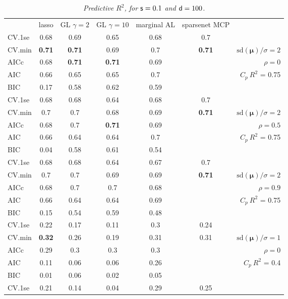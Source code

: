 \documentclass[12pt]{article}
\newcommand{\mr}[1]{\mathrm{#1}}
\newcommand{\bm}[1]{\mathbf{#1}}
\begin{document}
\begin{table}[p]\vspace{-.5cm}
\caption[l]{\label{r2}\it Predictive $R^2$, for ${\sf s}=0.1$ and  ${\sf d}=100$.}
\vspace{-.5cm}
\small{}
\begin{center}
\begin{tabular}{l*{5}{c}|r}
 & lasso & GL $\gamma=2$ & GL $\gamma=10$ & marginal AL & sparsenet MCP  &  \\
\cline{1-7}
CV.1se & 0.68 & 0.69 & 0.65 & 0.68 & 0.7 &\\
CV.min & {\bf 0.71} & {\bf 0.71} & 0.69 & 0.7 & {\bf 0.71} &  $\mr{sd}(\bm{\mu})/\sigma=2$ \\
AICc & 0.68 & {\bf 0.71} & {\bf 0.71} & 0.69 & & $\rho=0$ \\
AIC & 0.66 & 0.65 & 0.65 & 0.7 & & \multirow{2}{*}{$C_p ~ R^2$ = 0.75} \\
BIC & 0.17 & 0.58 & 0.62 & 0.59 & & \\
 \hline 
CV.1se & 0.68 & 0.68 & 0.64 & 0.68 & 0.7 &\\
CV.min & 0.7 & 0.7 & 0.68 & 0.69 & {\bf 0.71} &  $\mr{sd}(\bm{\mu})/\sigma=2$ \\
AICc & 0.68 & 0.7 & {\bf 0.71} & 0.69 & & $\rho=0.5$ \\
AIC & 0.66 & 0.64 & 0.64 & 0.7 & & \multirow{2}{*}{$C_p ~ R^2$ = 0.75} \\
BIC & 0.04 & 0.58 & 0.61 & 0.54 & & \\
 \hline 
CV.1se & 0.68 & 0.68 & 0.64 & 0.67 & 0.7 &\\
CV.min & 0.7 & 0.7 & 0.69 & 0.69 & {\bf 0.71} &  $\mr{sd}(\bm{\mu})/\sigma=2$ \\
AICc & 0.68 & 0.7 & 0.7 & 0.68 & & $\rho=0.9$ \\
AIC & 0.66 & 0.64 & 0.64 & 0.69 & & \multirow{2}{*}{$C_p ~ R^2$ = 0.75} \\
BIC & 0.15 & 0.54 & 0.59 & 0.48 & & \\
 \hline 
CV.1se & 0.22 & 0.17 & 0.11 & 0.3 & 0.24 &\\
CV.min & {\bf 0.32} & 0.26 & 0.19 & 0.31 & 0.31 &  $\mr{sd}(\bm{\mu})/\sigma=1$ \\
AICc & 0.29 & 0.3 & 0.3 & 0.3 & & $\rho=0$ \\
AIC & 0.11 & 0.06 & 0.06 & 0.26 & & \multirow{2}{*}{$C_p ~ R^2$ = 0.4} \\
BIC & 0.01 & 0.06 & 0.02 & 0.05 & & \\
 \hline 
CV.1se & 0.21 & 0.14 & 0.04 & 0.29 & 0.25 &\\

\end{tabular}
\end{center}
\end{table}
\end{document}

